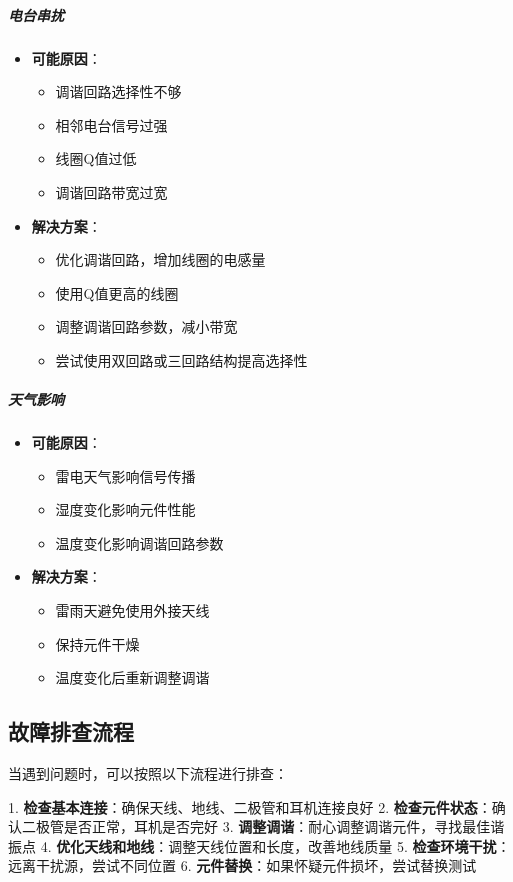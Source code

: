 \documentclass[12pt,UTF8]{ctexbook}
\begin{document}
\subparagraph{电台串扰}

\begin{itemize}[leftmargin=3.5em]
    \item \textbf{可能原因}：
    \begin{itemize}
        \item 调谐回路选择性不够
        \item 相邻电台信号过强
        \item 线圈Q值过低
        \item 调谐回路带宽过宽
    \end{itemize}
    \item \textbf{解决方案}：
    \begin{itemize}
        \item 优化调谐回路，增加线圈的电感量
        \item 使用Q值更高的线圈
        \item 调整调谐回路参数，减小带宽
        \item 尝试使用双回路或三回路结构提高选择性
    \end{itemize}
\end{itemize}

\subparagraph{天气影响}

\begin{itemize}[leftmargin=3.5em]
    \item \textbf{可能原因}：
    \begin{itemize}
        \item 雷电天气影响信号传播
        \item 湿度变化影响元件性能
        \item 温度变化影响调谐回路参数
    \end{itemize}
    \item \textbf{解决方案}：
    \begin{itemize}
        \item 雷雨天避免使用外接天线
        \item 保持元件干燥
        \item 温度变化后重新调整调谐
    \end{itemize}
\end{itemize}

\subsection{故障排查流程}

当遇到问题时，可以按照以下流程进行排查：

1. \textbf{检查基本连接}：确保天线、地线、二极管和耳机连接良好
2. \textbf{检查元件状态}：确认二极管是否正常，耳机是否完好
3. \textbf{调整调谐}：耐心调整调谐元件，寻找最佳谐振点
4. \textbf{优化天线和地线}：调整天线位置和长度，改善地线质量
5. \textbf{检查环境干扰}：远离干扰源，尝试不同位置
6. \textbf{元件替换}：如果怀疑元件损坏，尝试替换测试
\end{document}
